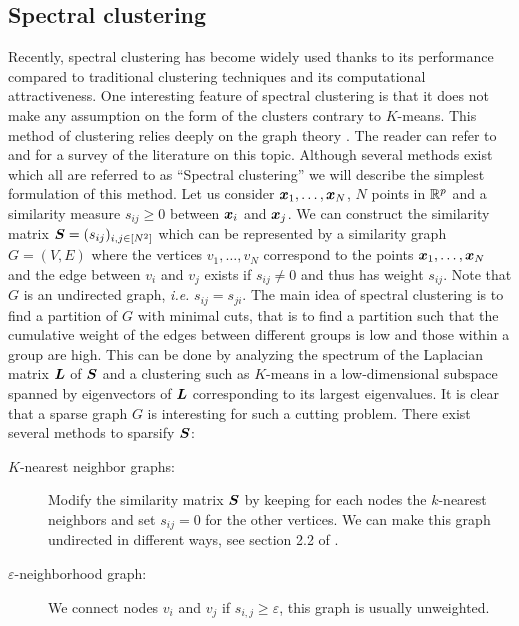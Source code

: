 \subsection{Spectral clustering}
Recently, spectral clustering has become widely used thanks to its performance compared to traditional clustering techniques and its computational attractiveness. One interesting feature of spectral clustering is that it does not make any assumption on the form of the clusters contrary to $K$-means. This method of clustering relies deeply on the graph theory \citep{Donath:1973:LBP:1664638.1664644,Fiedler1973}. The reader can refer to \citep{Luxburg:2007:TSC:1288822.1288832} and \citep{SPIELMAN2007284} for a survey of the literature on this topic. Although several methods exist which all are referred to as ``Spectral clustering'' we will describe the simplest formulation of this method. Let us consider $\boldsymbol x_1,\dots,\boldsymbol x_N$, $N$ points in ${\mathbb R}^p$ and a similarity measure $s_{ij} \geq 0$ between $\boldsymbol x_i$ and $\boldsymbol x_j$. We can construct the similarity matrix $\boldsymbol S=(s_{ij})_{i,j\in [N^2]}$ which can be represented by a similarity graph $G=(V,E)$ where the vertices $v_1,\dots,v_N$ correspond to the points $\boldsymbol x_1,\dots,\boldsymbol x_N$ and the edge between $v_i$ and $v_j$ exists if $s_{ij}\neq 0 $ and thus has weight $s_{ij}$. Note that $G$ is an undirected graph, \textit{i.e.} $s_{ij}=s_{ji}$. The main idea of spectral clustering is to find a partition of $G$ with minimal cuts, that is to find a partition such that the cumulative weight of the edges between different groups is low and those within a group are high. This can be done by analyzing the spectrum of the Laplacian matrix $\boldsymbol L$ of $\boldsymbol S$ and a clustering such as $K$-means in a low-dimensional subspace spanned by eigenvectors of $\boldsymbol L$ corresponding to its largest eigenvalues. It is clear that a sparse graph $G$ is interesting for such a cutting problem. There exist several methods to sparsify $\boldsymbol S$:
\begin{description}
\item[$K$-nearest neighbor graphs:] Modify the similarity matrix $\boldsymbol S$ by keeping for each nodes the $k$-nearest neighbors and set $s_{ij}=0$ for the other vertices. We can make this graph undirected in different ways, see section 2.2 of \citep{Luxburg:2007:TSC:1288822.1288832}.
\item[$\varepsilon$-neighborhood graph:] We connect nodes $v_i$ and $v_j$ if $s_{i,j}\geq \varepsilon$, this graph is usually unweighted.
\end{description}
